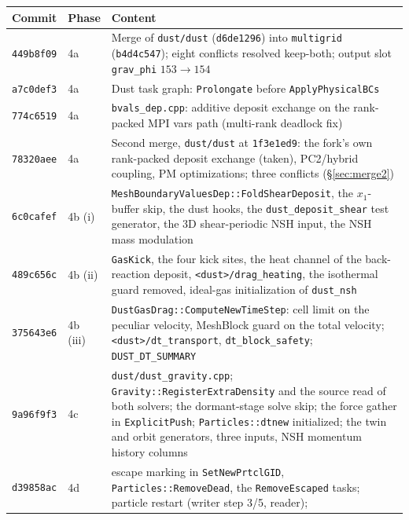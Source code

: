 \documentclass[11pt]{article}
\newcommand{\code}[1]{\texttt{#1}}
\newcommand{\file}[1]{\texttt{\small #1}}
\newcommand{\fn}[1]{\texttt{\small #1}}
\begin{document}
\begin{table}[htb]
\centering
\small
\begin{tabular}{@{}llp{9.4cm}@{}}
\toprule
Commit & Phase & Content \\
\midrule
\code{449b8f09} & 4a & Merge of \code{dust/dust} (\code{d6de1296}) into \code{multigrid}
                       (\code{b4d4c547}); eight conflicts resolved keep-both; output slot
                       \code{grav\_phi} $153 \to 154$ \\
\code{a7c0def3} & 4a & Dust task graph: \fn{Prolongate} before \fn{ApplyPhysicalBCs} \\
\code{774c6519} & 4a & \file{bvals\_dep.cpp}: additive deposit exchange on the rank-packed
                       MPI vars path (multi-rank deadlock fix) \\
\code{78320aee} & 4a & Second merge, \code{dust/dust} at \code{1f3e1ed9}: the fork's own
                       rank-packed deposit exchange (taken), PC2/hybrid coupling, PM
                       optimizations; three conflicts (\S\ref{sec:merge2}) \\
\code{6c0cafef} & 4b (i) & \fn{MeshBoundaryValuesDep::FoldShearDeposit}, the $x_1$-buffer skip,
                  the dust hooks, the \code{dust\_deposit\_shear} test generator, the
                  3D shear-periodic NSH input, the NSH mass modulation \\
\code{489c656c} & 4b (ii) & \fn{GasKick}, the four kick sites, the heat channel of the
                  back-reaction deposit, \code{<dust>/drag\_heating}, the isothermal
                  guard removed, ideal-gas initialization of \code{dust\_nsh} \\
\code{375643e6} & 4b (iii) & \fn{DustGasDrag::ComputeNewTimeStep}: cell limit on the peculiar
                  velocity, MeshBlock guard on the total velocity;
                  \code{<dust>/dt\_transport}, \code{dt\_block\_safety};
                  \code{DUST\_DT\_SUMMARY} \\
\code{9a96f9f3} & 4c & \file{dust/dust\_gravity.cpp}; \fn{Gravity::RegisterExtraDensity} and the
              source read of both solvers; the dormant-stage solve skip; the force gather
              in \fn{ExplicitPush}; \code{Particles::dtnew} initialized; the twin and
              orbit generators, three inputs, NSH momentum history columns \\
\code{d39858ac} & 4d & escape marking in \fn{SetNewPrtclGID}, \fn{Particles::RemoveDead}, the
              \fn{RemoveEscaped} tasks; particle restart (writer step 3/5, reader);

\end{tabular}
\end{table}
\end{document}
